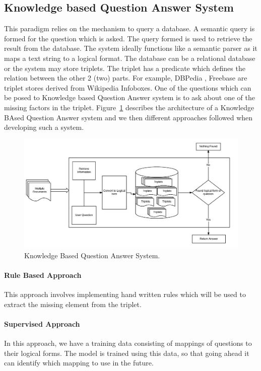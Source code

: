 \subsection{Knowledge based Question Answer System}
This paradigm relies on the mechanism to query a database. A semantic query is formed for the question which is asked. The query formed is used to retrieve the result from the database. The system ideally functions like a semantic parser as it maps a text string to a logical format. The database can be a relational database or the system may store triplets. The triplet has a predicate which defines the relation between the other 2 (two) parts. For example, DBPedia \cite{auer2007dbpedia}, Freebase \cite {bollacker2008freebase} are triplet stores derived from Wikipedia Infoboxes. One of the questions which can be posed to Knowledge based Question Answer system is to ask about one of the missing factors in the triplet. Figure~\ref{fig:KnowledgeBased_QA} describes the architecture of a Knowledge BAsed Question Answer system and we then different approaches followed when developing such a system.

\begin{figure}[htb]
\centering
\includegraphics[scale=0.8]{images/KnowledgeBased_QA.jpg}
\caption{Knowledge Based Question Answer System.} 
\label{fig:KnowledgeBased_QA}
\end{figure}

\break
 
\paragraph{Rule Based Approach}
This approach involves implementing hand written rules which will be used to extract the missing element from the triplet.
 
 \paragraph{Supervised Approach}
In this approach, we have a training data consisting of mappings of questions to their logical forms. The model is trained using this data, so that going ahead it can identify which mapping to use in the future.
 
